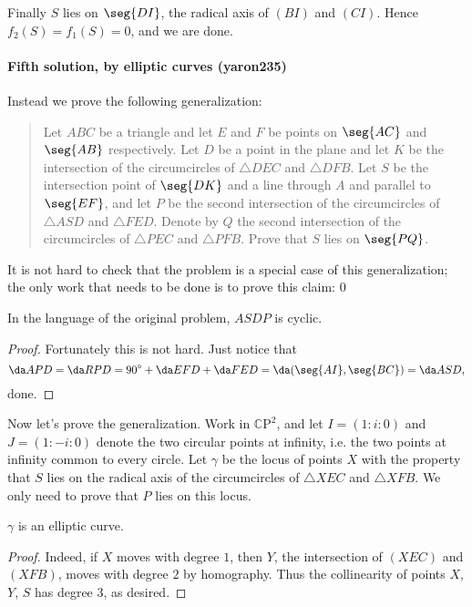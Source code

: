 Finally $S$ lies on $\seg{DI}$, the radical axis of $(BI)$ and $(CI)$. Hence $f_2(S)=f_1(S)=0$, and we are done.

\paragraph{Fifth solution, by elliptic curves (yaron235)}     Instead we prove the following generalization:
\begin{quote}
    Let $ABC$ be a triangle and let $E$ and $F$ be points on $\seg{AC}$ and $\seg{AB}$ respectively. Let $D$ be a point in the plane and let $K$ be the intersection of the circumcircles of $\triangle DEC$ and $\triangle DFB$. Let $S$ be the intersection point of $\seg{DK}$ and a line through $A$ and parallel to $\seg{EF}$, and let $P$ be the second intersection of the circumcircles of $\triangle ASD$ and $\triangle FED$. Denote by $Q$ the second intersection of the circumcircles of $\triangle PEC$ and $\triangle PFB$. Prove that $S$ lies on $\seg{PQ}$.
\end{quote}
It is not hard to check that the problem is a special case of this generalization; the only work that needs to be done is to prove this claim:
\setcounter{claim}0
\begin{claim}
    In the language of the original problem, $ASDP$ is cyclic.
\end{claim}
\begin{proof}
    Fortunately this is not hard. Just notice that \[\da APD=\da RPD=90^\circ+\da EFD+\da FED=\da(\seg{AI},\seg{BC})=\da ASD,\]
    done.
\end{proof}

Now let's prove the generalization. Work in $\mathbb C\mathrm P^2$, and let $I=(1:i:0)$ and $J=(1:-i:0)$ denote the two circular points at infinity, i.e. the two points at infinity common to every circle. Let $\gamma$ be the locus of points $X$ with the property that $S$ lies on the radical axis of the circumcircles of $\triangle XEC$ and $\triangle XFB$. We only need to prove that $P$ lies on this locus.
\begin{claim}
    $\gamma$ is an elliptic curve.
\end{claim}
\begin{proof}
    Indeed, if $X$ moves with degree $1$, then $Y$, the intersection of $(XEC)$ and $(XFB)$, moves with degree $2$ by homography. Thus the collinearity of points $X$, $Y$, $S$ has degree $3$, as desired.
\end{proof}

